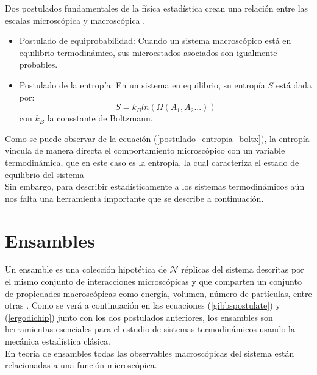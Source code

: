 Dos postulados fundamentales de la física estadística crean una relación entre las escalas microscópica y macroscópica \cite{Huang_1987}\cite{tuckerman2010}.\\

\begin{itemize}
    \item Postulado de equiprobabilidad: Cuando un sistema macroscópico está en equilibrio termodinámico, sus microestados asociados son igualmente probables.
    
    \item Postulado de la entropía: En un sistema en equilibrio, su entropía $S$ está dada por:
    \begin{equation}\label{postulado_entropia_boltx}
        S=k_{B}ln(\Omega(A_1, A_2...))
    \end{equation}
    con $k_B$ la consstante de Boltzmann.
\end{itemize}

Como se puede observar de la ecuación (\ref{postulado_entropia_boltx}), la entropía vincula de manera directa el comportamiento microscópico con un variable termodinámica, que en este caso es la entropía, la cual caracteriza el estado de equilibrio del sistema\\

Sin embargo, para describir estadísticamente a los sistemas termodinámicos aún nos falta una herramienta importante que se describe a continuación.

\section{Ensambles}

Un ensamble es una colección hipotética de $\mathcal{N}$ réplicas del sistema descritas por el mismo conjunto de interacciones microscópicas y que comparten un conjunto de propiedades macroscópicas como energía, volumen, número de partículas, entre otras \cite{tuckerman2010}. Como se verá a continuación en las ecuaciones (\ref{gibbspostulate}) y (\ref{ergodichip}) junto con los dos postulados anteriores, los ensambles son herramientas esenciales para el estudio de sistemas termodinámicos usando la mecánica estadística clásica.\\

En teoría de ensambles todas las observables macroscópicas del sistema están relacionadas a una función microscópica.\\

